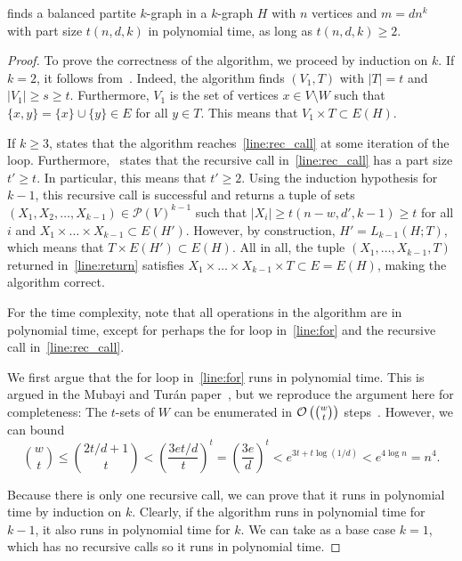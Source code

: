 \begin{theorem} %
     finds a balanced partite $k$-graph in a $k$-graph $H$ with
    $n$ vertices and $m = d n^k$ with part size $t(n, d, k)$ in polynomial time,
    as long as $t(n, d, k) \geq 2$.
    \begin{proof}
        To prove the correctness of the algorithm, we proceed by induction on $k$.
        If $k=2$, it follows from~.
        Indeed, the algorithm finds $(V_1, T)$ with $|T| = t$ and $|V_1| \geq s \geq t$.
        Furthermore, $V_1$ is the set of vertices $x \in V \setminus W$ such that
        $\{x, y\} = \{x\} \cup \{y\} \in E$ for all $y \in T$.
        This means that $V_1 \times T \subset E(H)$.

        If $k \geq 3$,
         states that the algorithm
        reaches~\cref{line:rec_call} at some iteration of the loop.
        Furthermore,~ states that the recursive call in~\cref{line:rec_call}
        has a part size $t' \geq t$.
        In particular, this means that $t' \geq 2$.
        Using the induction hypothesis for $k-1$,
        this recursive call is successful and
        returns a tuple of sets
        $(X_1, X_2, \dots, X_{k-1}) \in \mathcal{P}(V)^{k-1}$ such that $|X_i| \geq t(n-w, d', k-1) \geq t$
        for all $i$ and $X_1 \times \dots \times X_{k-1} \subset E(H')$.
        However, by construction, $H' = L_{k-1}(H; T)$, which means that $T \times E(H') \subset E(H)$.
        All in all, the tuple $(X_1, \dots, X_{k-1}, T)$ returned in~\cref{line:return}
        satisfies $X_1 \times \dots \times X_{k-1} \times T \subset E = E(H)$, making the algorithm correct.

        For the time complexity, note that all operations in the algorithm are in polynomial time, %
        except for perhaps the for loop in~\cref{line:for} and the recursive call in~\cref{line:rec_call}.

        We first argue that the for loop in~\cref{line:for} runs in polynomial time.
        This is argued in the Mubayi and Turán paper~\cite{MUBAYI2010174},
        but we reproduce the argument here for completeness:
        The $t$-sets of $W$ can be enumerated in
        $\mathcal{O}\left(\binom{w}{t}\right)$ steps~\cite{reingold1977combinatorial}.
        However, we can bound
        \[
            \binom{w}{t} \leq
            \binom{2t/d + 1}{t} <
            \left( \frac{3et/d}{t} \right)^{t} =
            \left( \frac{3e}{d} \right)^{t} <
            e^{3 t + t \log (1/d)} <
            e^{4 \log n} = n^4.
        \]

        Because there is only one recursive call, we can prove that it runs in polynomial time
        by induction on $k$.
        Clearly, if the algorithm runs in polynomial time for $k-1$,
        it also runs in polynomial time for $k$.
        We can take as a base case $k=1$, which has no recursive calls so
        it runs in polynomial time.

    \end{proof}
\end{theorem}





